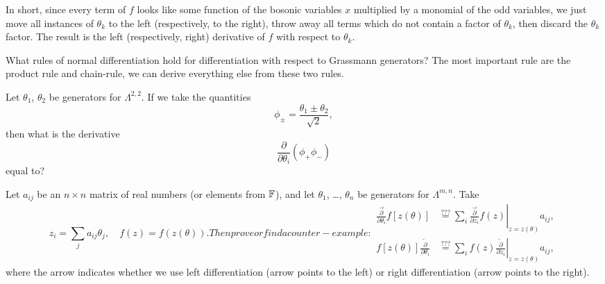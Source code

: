 In short, since every term of $f$ looks like some function of the
bosonic variables $x$ multiplied by a monomial of the odd variables, we
just move all instances of $\theta_{k}$ to the left (respectively, to the right), throw
away all terms which do not contain a factor of $\theta_{k}$, then
discard the $\theta_{k}$ factor. The result is the left (respectively,
right) derivative of $f$ with respect to $\theta_{k}$.

\begin{puzzle}
What rules of normal differentiation hold for differentiation with
respect to Grassmann generators? The most important rule are the product
rule and chain-rule, we can derive everything else from these two rules.
\end{puzzle}

\begin{exercise}
Let $\theta_{1}$, $\theta_{2}$ be generators for $\Lambda^{2,2}$.
If we take the quantities
\begin{equation}
\phi_{\pm} = \frac{\theta_{1}\pm\theta_{2}}{\sqrt{2}},
\end{equation}
then what is the derivative
\begin{equation*}
\frac{\partial}{\partial\theta_{i}}(\phi_{+}\phi_{-})
\end{equation*}
equal to?
\end{exercise}

\begin{exercise}
  Let $a_{ij}$ be an $n\times n$ matrix of real numbers (or elements
  from $\mathbb{F}$), and let $\theta_{1}$, \dots, $\theta_{n}$ be generators
  for $\Lambda^{m,n}$. Take
\begin{subequations}
  \begin{equation}
z_{i} = \sum_{j}a_{ij}\theta_{j},\quad f(z)=f(z(\theta)).
  \end{equation}
  Then prove or find a counter-example:
  \begin{align}
    \frac{\overrightarrow{\partial}}{\partial\theta_{i}}f[z(\theta)] &\stackrel{???}{=} \sum_{i}\left.\frac{\overrightarrow{\partial}}{\partial z_{i}}f(z)\right|_{z=z(\theta)}a_{ij},\\
    f[z(\theta)]\frac{\overleftarrow{\partial}}{\partial\theta_{i}} &\stackrel{???}{=} \sum_{i}\left.f(z)\frac{\overleftarrow{\partial}}{\partial z_{i}}\right|_{z=z(\theta)}a_{ij},
  \end{align}
\end{subequations}
where the arrow indicates whether we use left differentiation (arrow
points to the left) or right differentiation (arrow points to the right).
\end{exercise}

